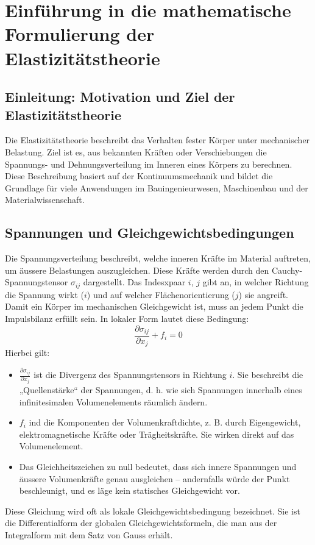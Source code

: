 %
%
%
%
\section{Einführung in die mathematische Formulierung der Elastizitätstheorie
\label{elastomechanik:section:math}}
\subsection{Einleitung: Motivation und Ziel der Elastizitätstheorie}
Die Elastizitätstheorie beschreibt das Verhalten fester Körper unter mechanischer Belastung. 
Ziel ist es, aus bekannten Kräften oder Verschiebungen die Spannungs- und Dehnungsverteilung im Inneren eines Körpers zu berechnen. 
Diese Beschreibung basiert auf der Kontinuumsmechanik und bildet die Grundlage für viele Anwendungen im Bauingenieurwesen, Maschinenbau und der Materialwissenschaft.

\subsection{Spannungen und Gleichgewichtsbedingungen
\label{elastomechanik:math:subsection:gleichgewicht}}
Die Spannungsverteilung beschreibt, welche inneren Kräfte im Material auftreten, um äussere Belastungen auszugleichen. 
Diese Kräfte werden durch den Cauchy-Spannungstensor $\sigma_{ij}$ dargestellt. 
Das Indesxpaar $i$, $j$ gibt an, in welcher Richtung die Spannung wirkt ($i$) und auf welcher Flächenorientierung ($j$) sie angreift.
Damit ein Körper im mechanischen Gleichgewicht ist, muss an jedem Punkt die Impulsbilanz erfüllt sein. In lokaler Form lautet diese Bedingung:
\begin{equation}
	\frac{\partial \sigma_{ij}}{\partial x_j} + f_i = 
	0
\label{elastomechanik:math:eqn:gleichgewicht}
\end{equation}
Hierbei gilt:
\begin{itemize}
	\item $\frac{\partial \sigma_{ij}}{\partial x_j}$ ist die Divergenz des Spannungstensors in Richtung $i$. 
	Sie beschreibt die „Quellenstärke“ der Spannungen, d. h. wie sich Spannungen innerhalb eines infinitesimalen Volumenelements räumlich ändern.
	\item $f_i$ ind die Komponenten der Volumenkraftdichte, z. B. durch Eigengewicht, elektromagnetische Kräfte oder Trägheitskräfte. Sie wirken direkt auf das Volumenelement.
	\item Das Gleichheitszeichen zu null bedeutet, dass sich innere Spannungen und äussere Volumenkräfte genau ausgleichen – andernfalls würde der Punkt beschleunigt, und es läge kein statisches Gleichgewicht vor.
\end{itemize}
Diese Gleichung wird oft als lokale Gleichgewichtsbedingung bezeichnet. 
Sie ist die Differentialform der globalen Gleichgewichtsformeln, die man aus der Integralform mit dem Satz von Gauss erhält.

